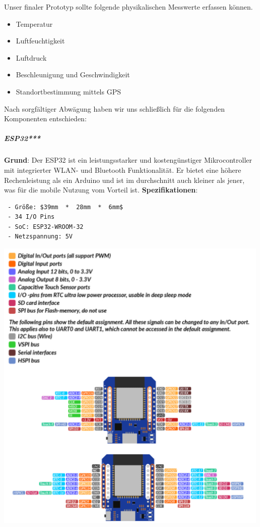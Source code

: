 \documentclass[
    headings=optiontotocandhead,%
    twoside,
    numbers=noenddot,%
    12pt, %
    titlepage, %
    parskip=full, %
    listof=leveldown, 
    numbers=noenddot, %
    a4paper,DIV=14,
    BCOR=15mm,
]{scrbook}
\let\origfigure=\figure
\let\endorigfigure=\endfigure
\renewenvironment{figure}[1][]{%
   \origfigure[H]
}{%
   \endorigfigure
}
\providecommand{\tightlist}{%
  \setlength{\itemsep}{0pt}\setlength{\parskip}{0pt}}
\begin{document}
Unser finaler Prototyp sollte folgende physikalischen Messwerte erfassen
können.

\begin{itemize}
\tightlist
\item
  Temperatur
\item
  Luftfeuchtigkeit
\item
  Luftdruck
\item
  Beschleunigung und Geschwindigkeit
\item
  Standortbestimmung mittels GPS
\end{itemize}

Nach sorgfältiger Abwägung haben wir uns schließlich für die folgenden
Komponenten entschieden:

\hypertarget{esp32}{%
\subparagraph{ESP32***}\label{esp32}}

\textbf{Grund}: Der ESP32 ist ein leistungsstarker und kostengünstiger
Mikrocontroller mit integrierter WLAN- und Bluetooth Funktionalität. Er
bietet eine höhere Rechenleistung als ein Arduino und ist im
durchschnitt auch kleiner als jener, was für die mobile Nutzung vom
Vorteil ist. \textbf{Spezifikationen}:

\begin{lstlisting}
 - Größe: $39mm  *  28mm  *  6mm$
 - 34 I/O Pins
 - SoC: ESP32-WROOM-32
 - Netzspannung: 5V
\end{lstlisting}

\begin{figure}
\centering
\includegraphics[width=5.20833in,height=\textheight]{img/Kampl/ESP32-Pins.png}
\caption{ArduinoPins {[}\protect\hyperlink{ref-ESP32-Datenblatt}{9}{]}}
\end{figure}
\end{document}
